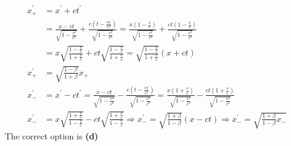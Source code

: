 \begin{enumerate}
\begin{answer}
\begin{align*}
x_{+}^{\prime}&=x^{\prime}+c t^{\prime}\\
&=\frac{x-v t}{\sqrt{1-\frac{v^{2}}{c^{2}}}}+\frac{c\left(t-\frac{v x}{c^{2}}\right)}{\sqrt{1-\frac{v^{2}}{c^{2}}}}=\frac{x\left(1-\frac{v}{c}\right)}{\sqrt{1-\frac{v^{2}}{c^{2}}}}+\frac{c t\left(1-\frac{v}{c}\right)}{\sqrt{1-\frac{v^{2}}{c^{2}}}}\\
&=x \sqrt{\frac{1-\frac{v}{c}}{1+\frac{v}{c}}}+c t \sqrt{\frac{1-\frac{v}{c}}{1+\frac{v}{c}}}=\sqrt{\frac{1-\frac{v}{c}}{1+\frac{v}{c}}}(x+c t)\\
x_{+}^{\prime}&=\sqrt{\frac{1-\beta}{1+\beta}} x_{+}\\
x_{-}^{\prime}&=x^{\prime}-c t^{\prime}=\frac{x-v t}{\sqrt{1-\frac{v^{2}}{c^{2}}}}-\frac{c\left(t-\frac{v x}{c^{2}}\right)}{\sqrt{1-\frac{v^{2}}{c^{2}}}}=\frac{x\left(1+\frac{v}{c}\right)}{\sqrt{1-\frac{v^{2}}{c^{2}}}}-\frac{c t\left(1+\frac{v}{c}\right)}{\sqrt{1-\frac{v^{2}}{c^{2}}}}\\
x_{-}^{\prime}&=x \sqrt{\frac{1+\frac{v}{c}}{1-\frac{v}{c}}}-c t \sqrt{\frac{1+\frac{v}{c}}{1-\frac{v}{c}}} \Rightarrow x_{-}^{\prime}=\sqrt{\frac{1+\beta}{1-\beta}}(x-c t) \Rightarrow x_{-}^{\prime}=\sqrt{\frac{1+\beta}{1-\beta} x_{-}}
\end{align*}
The correct option is \textbf{(d)}	
\end{answer}


\end{enumerate}
